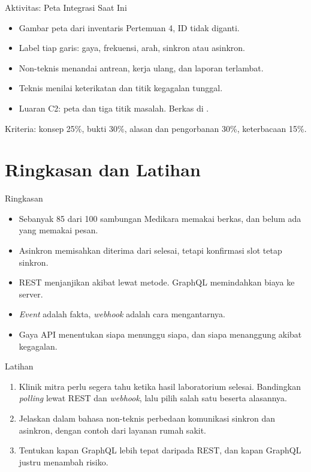 \documentclass[aspectratio=169, table, 12pt]{beamer}
\begin{document}
\begin{frame}{{\Large Aktivitas: Peta Integrasi Saat Ini}}
  \vspace{10pt}
  \begin{itemize}
    \item Gambar peta dari inventaris Pertemuan 4, ID tidak diganti.
    \item Label tiap garis: gaya, frekuensi, arah, sinkron atau asinkron.
    \item Non-teknis menandai antrean, kerja ulang, dan laporan terlambat.
    \item Teknis menilai keterikatan dan titik kegagalan tunggal.
    \item Luaran C2: peta dan tiga titik masalah. Berkas di .
  \end{itemize}
  \vspace{6pt}
  {\small Kriteria: konsep 25\%, bukti 30\%, alasan dan pengorbanan 30\%, keterbacaan 15\%.}
\end{frame}

\section{Ringkasan dan Latihan}

\begin{frame}{{\Large Ringkasan}}
  \vspace{10pt}
  \begin{itemize}
    \item Sebanyak 85 dari 100 sambungan Medikara memakai berkas, dan belum ada yang memakai pesan.
    \item Asinkron memisahkan diterima dari selesai, tetapi konfirmasi slot tetap sinkron.
    \item REST menjanjikan akibat lewat metode. GraphQL memindahkan biaya ke server.
    \item \textit{Event} adalah fakta, \textit{webhook} adalah cara mengantarnya.
    \item Gaya API menentukan siapa menunggu siapa, dan siapa menanggung akibat kegagalan.
  \end{itemize}
\end{frame}

\begin{frame}{{\Large Latihan}}
  \vspace{10pt}
  \begin{enumerate}
    \item Klinik mitra perlu segera tahu ketika hasil laboratorium selesai. Bandingkan \textit{polling} lewat REST dan \textit{webhook}, lalu pilih salah satu beserta alasannya.
    \item Jelaskan dalam bahasa non-teknis perbedaan komunikasi sinkron dan asinkron, dengan contoh dari layanan rumah sakit.
    \item Tentukan kapan GraphQL lebih tepat daripada REST, dan kapan GraphQL justru menambah risiko.
  \end{enumerate}
\end{frame}
\end{document}
